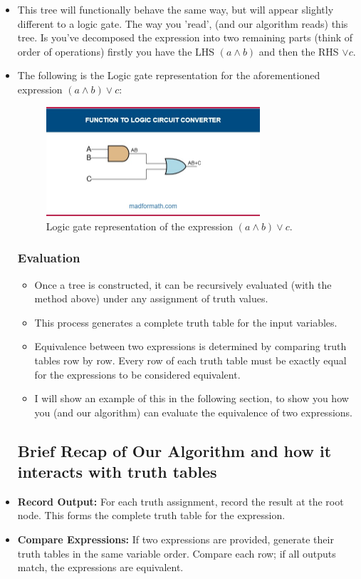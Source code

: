 \documentclass[11pt]{diazessay} %
\begin{document}
\begin{itemize}
\begin{center}
\end{center}
	\item This tree will functionally behave the same way, but will appear slightly different to a logic gate. The way you 'read', (and our algorithm reads) this tree. Is you've decomposed the expression into two remaining parts (think of order of operations) firstly you have the LHS $(a \wedge b)$ and then the RHS $\vee c$.
	\item The following is the Logic gate representation for the aforementioned expression $(a \wedge b) \vee c$:
	\begin{figure}[h] %
    \centering
    \includegraphics[width=0.75\textwidth]{LogicGate}
    \caption{Logic gate representation of the expression $(a \wedge b) \vee c$.}
    \label{fig:logic_gate}
\end{figure}


\subsubsection*{Evaluation}
\begin{itemize}
    \item Once a tree is constructed, it can be recursively evaluated (with the method above) under any 
    assignment of truth values. 
    \item This process generates a complete truth table for the input variables.
    \item Equivalence between two expressions is determined by comparing truth 
    tables row by row. Every row of each truth table must be exactly equal for the expressions to be considered equivalent.
	\item I will show an example of this in the following section, to show you how you (and our algorithm) can evaluate the equivalence of two expressions.
\end{itemize}

\subsection{Brief Recap of Our Algorithm and how it interacts with truth tables}
\item \textbf{Record Output:} For each truth assignment, record the result at the root node. This forms the complete truth table for the expression.
    \item \textbf{Compare Expressions:} If two expressions are provided, generate their truth tables in the same variable order. Compare each row; if all outputs match, the expressions are equivalent.


\end{itemize}
\end{document}
